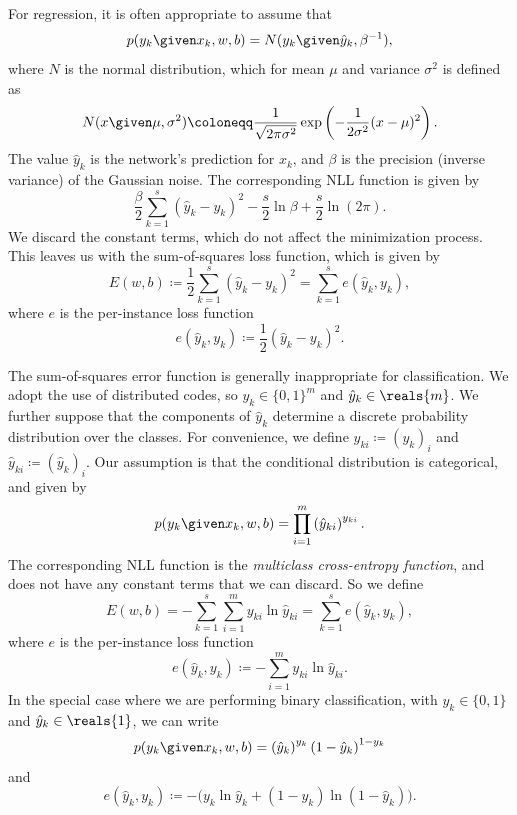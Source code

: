 \documentclass[11pt,a4paper]{article}
\numberwithin{equation}{section}
\begin{document}
For regression, it is often appropriate to assume that
\[
	p(y_k \given x_k, w, b) = N(y_k \given \hat{y}_k, \beta^{-1}),
\]
where $N$ is the normal distribution, which for mean $\mu$ and variance
$\sigma^2$ is defined as
\[
	N(x \given \mu, \sigma^2) \coloneqq \frac{1}{\sqrt{2 \pi \sigma^2}}
		\exp\left( -\frac{1}{2 \sigma^2} (x - \mu)^2 \right).
\]
The value $\hat{y}_k$ is the network's prediction for $x_k$, and $\beta$ is the
precision (inverse variance) of the Gaussian noise. The corresponding NLL
function is given by
\[
	\frac{\beta}{2} \sum_{k = 1}^s \left(\hat{y}_k - y_k\right)^2 -
		\frac{s}{2} \ln\beta + \frac{s}{2} \ln(2 \pi).
\]
We discard the constant terms, which do not affect the minimization process.
This leaves us with the sum-of-squares loss function, which is given by
\begin{equation}
	E(w, b)
	\coloneqq \frac{1}{2} \sum_{k = 1}^s \left(\hat{y}_k - y_k\right)^2
	= \sum_{k = 1}^s e(\hat{y}_k, y_k),
	\label{eq:sum_of_squares}
\end{equation}
where $e$ is the per-instance loss function
\[
	e(\hat{y}_k, y_k) \coloneqq \frac{1}{2} \left(\hat{y}_k - y_k\right)^2.
\]

The sum-of-squares error function is generally inappropriate for classification.
We adopt the use of distributed codes, so $y_k \in \{0, 1\}^m$ and $\hat{y}_k
\in \reals{m}$. We further suppose that the components of $\hat{y}_k$ determine
a discrete probability distribution over the classes. For convenience, we define
$y_{ki} \coloneqq (y_k)_i$ and $\hat{y}_{ki} \coloneqq (\hat{y}_k)_i$. Our
assumption is that the conditional distribution is categorical, and given by
\[
	p(y_k \given x_k, w, b) = \prod_{i = 1}^m \left(\hat{y}_{ki}\right)^{y_{ki}}.
\]
The corresponding NLL function is the \emph{multiclass cross-entropy function},
and does not have any constant terms that we can discard. So we define
\[
	E(w, b)
	= -\sum_{k = 1}^s \sum_{i = 1}^m y_{ki} \ln\hat{y}_{ki}
	= \sum_{k = 1}^s e(\hat{y}_k, y_k),
\]
where $e$ is the per-instance loss function
\[
	e(\hat{y}_k, y_k) \coloneqq -\sum_{i = 1}^m y_{ki} \ln\hat{y}_{ki}.
\]
In the special case where we are performing binary classification, with $y_k \in
\{0, 1\}$ and $\hat{y}_k \in \reals{1}$, we can write
\[
	p(y_k \given x_k, w, b) = \left(\hat{y}_k\right)^{y_k}
		\left(1 - \hat{y}_k\right)^{1 - y_k}
\]
and
\[
	e(\hat{y}_k, y_k) \coloneqq -\big(
		y_k \ln\hat{y}_k + (1 - y_k) \ln(1 - \hat{y}_k) \big).
\]
\end{document}
